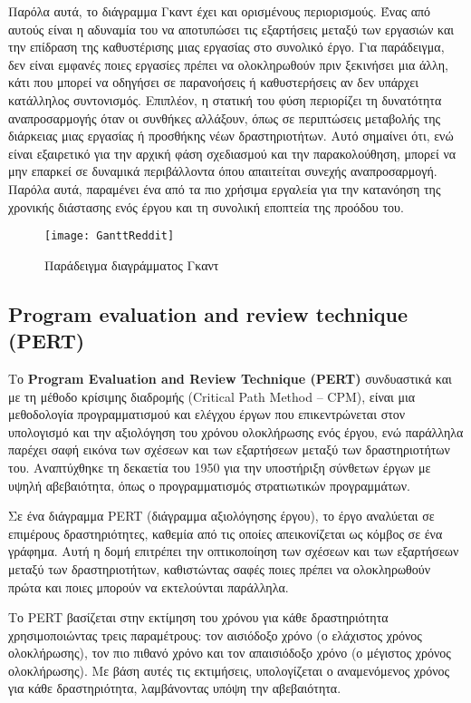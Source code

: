             Παρόλα αυτά, το διάγραμμα Γκαντ έχει και ορισμένους περιορισμούς. Ένας από αυτούς είναι η αδυναμία του να αποτυπώσει τις εξαρτήσεις μεταξύ των εργασιών και την επίδραση της καθυστέρισης μιας εργασίας στο συνολικό έργο. Για παράδειγμα, δεν είναι εμφανές ποιες εργασίες πρέπει να ολοκληρωθούν πριν ξεκινήσει μια άλλη, κάτι που μπορεί να οδηγήσει σε παρανοήσεις ή καθυστερήσεις αν δεν υπάρχει κατάλληλος συντονισμός. Επιπλέον, η στατική του φύση περιορίζει τη δυνατότητα αναπροσαρμογής όταν οι συνθήκες αλλάξουν, όπως σε περιπτώσεις μεταβολής της διάρκειας μιας εργασίας ή προσθήκης νέων δραστηριοτήτων. Αυτό σημαίνει ότι, ενώ είναι εξαιρετικό για την αρχική φάση σχεδιασμού και την παρακολούθηση, μπορεί να μην επαρκεί σε δυναμικά περιβάλλοντα όπου απαιτείται συνεχής αναπροσαρμογή. Παρόλα αυτά, παραμένει ένα από τα πιο χρήσιμα εργαλεία για την κατανόηση της χρονικής διάστασης ενός έργου και τη συνολική εποπτεία της προόδου του. \cite{Xenos}

            \begin{figure}[h!] \noindent \centering
                \texttt{[image: GanttReddit]}
                \caption{Παράδειγμα διαγράμματος Γκαντ}
            \end{figure}

        \subsection{Program evaluation and review technique (PERT)}
            Το \textbf{Program Evaluation and Review Technique (PERT)} συνδυαστικά και με τη μέθοδο κρίσιμης διαδρομής (Critical Path Method -- CPM), είναι μια μεθοδολογία προγραμματισμού και ελέγχου έργων που επικεντρώνεται στον υπολογισμό και την αξιολόγηση του χρόνου ολοκλήρωσης ενός έργου, ενώ παράλληλα παρέχει σαφή εικόνα των σχέσεων και των εξαρτήσεων μεταξύ των δραστηριοτήτων του. Αναπτύχθηκε τη δεκαετία του 1950 για την υποστήριξη σύνθετων έργων με υψηλή αβεβαιότητα, όπως ο προγραμματισμός στρατιωτικών προγραμμάτων.

            Σε ένα διάγραμμα PERT (διάγραμμα αξιολόγησης έργου), το έργο αναλύεται σε επιμέρους δραστηριότητες, καθεμία από τις οποίες απεικονίζεται ως κόμβος σε ένα γράφημα. Αυτή η δομή επιτρέπει την οπτικοποίηση των σχέσεων και των εξαρτήσεων μεταξύ των δραστηριοτήτων, καθιστώντας σαφές ποιες πρέπει να ολοκληρωθούν πρώτα και ποιες μπορούν να εκτελούνται παράλληλα.

            Το PERT βασίζεται στην εκτίμηση του χρόνου για κάθε δραστηριότητα χρησιμοποιώντας τρεις παραμέτρους: τον αισιόδοξο χρόνο (ο ελάχιστος χρόνος ολοκλήρωσης), τον πιο πιθανό χρόνο και τον απαισιόδοξο χρόνο (ο μέγιστος χρόνος ολοκλήρωσης). Με βάση αυτές τις εκτιμήσεις, υπολογίζεται ο αναμενόμενος χρόνος για κάθε δραστηριότητα, λαμβάνοντας υπόψη την αβεβαιότητα.

